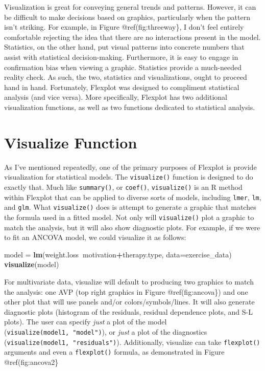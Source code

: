\documentclass[,]{book}
\newenvironment{Shaded}{\begin{snugshade}}{\end{snugshade}}
\newcommand{\KeywordTok}[1]{\textcolor[rgb]{0.13,0.29,0.53}{\textbf{#1}}}
\newcommand{\DataTypeTok}[1]{\textcolor[rgb]{0.13,0.29,0.53}{#1}}
\newcommand{\StringTok}[1]{\textcolor[rgb]{0.31,0.60,0.02}{#1}}
\newcommand{\OperatorTok}[1]{\textcolor[rgb]{0.81,0.36,0.00}{\textbf{#1}}}
\newcommand{\NormalTok}[1]{#1}
\begin{document}
Visualization is great for conveying general trends and patterns.
However, it can be difficult to make decisions based on graphics,
particularly when the pattern isn't striking. For example, in Figure
@ref(fig:threeway\}, I don't feel entirely comfortable rejecting the
idea that there are no interactions present in the model. Statistics, on
the other hand, put visual patterns into concrete numbers that assist
with statistical decision-making. Furthermore, it is easy to engage in
confirmation bias when viewing a graphic. Statistics provide a
much-needed reality check. As such, the two, statistics and
visualizations, ought to proceed hand in hand. Fortunately, Flexplot was
designed to compliment statistical analysis (and vice versa). More
specifically, Flexplot has two additional visualization functions, as
well as two functions dedicated to statistical analysis.

\section*{Visualize Function}\label{visualize-function}

As I've mentioned repeatedly, one of the primary purposes of Flexplot is
provide visualization for statistical models. The \texttt{visualize()}
function is designed to do exactly that. Much like \texttt{summary()},
or \texttt{coef()}, \texttt{visualize()} is an R method within Flexplot
that can be applied to diverse sorts of models, including \texttt{lmer},
\texttt{lm}, and \texttt{glm}. What \texttt{visualize()} does is attempt
to generate a graphic that matches the formula used in a fitted model.
Not only will \texttt{visualize()} plot a graphic to match the analysis,
but it will also show diagnostic plots. For example, if we were to fit
an ANCOVA model, we could visualize it as follows:

\begin{Shaded}
\begin{Highlighting}[]
\NormalTok{model =}\StringTok{ }\KeywordTok{lm}\NormalTok{(weight.loss}\OperatorTok{~}\NormalTok{motivation}\OperatorTok{+}\NormalTok{therapy.type, }
           \DataTypeTok{data=}\NormalTok{exercise_data)}
\KeywordTok{visualize}\NormalTok{(model)}
\end{Highlighting}
\end{Shaded}

For multivariate data, visualize will default to producing two graphics
to match the analysis: one AVP (top right graphics in Figure
@ref(fig:ancova\}) and one other plot that will use panels and/or
colors/symbols/lines. It will also generate diagnostic plots (histogram
of the residuals, residual dependence plots, and S-L plots). The user
can specify \emph{just} a plot of the model
(\texttt{visualize(model1,\ "model")}), or \emph{just} a plot of the
diagnostics (\texttt{visualize(model1,\ "residuals")}). Additionally,
visualize can take \texttt{flexplot()} arguments and even a
\texttt{flexplot()} formula, as demonstrated in Figure
@ref(fig:ancova2\}
\end{document}
